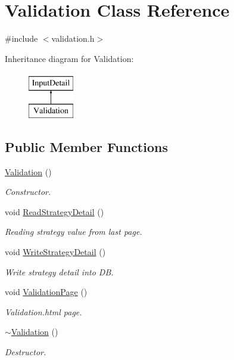 \hypertarget{classValidation}{\section{Validation Class Reference}
\label{classValidation}
}


{\ttfamily \#include $<$validation.\-h$>$}

Inheritance diagram for Validation\-:\begin{figure}[H]
\begin{center}
\leavevmode
\includegraphics[height=2.000000cm]{classValidation}
\end{center}
\end{figure}
\subsection*{Public Member Functions}
\begin{DoxyCompactItemize}
\item 
\hyperlink{classValidation_ada040c6d31004cc277e2b74290eec266}{Validation} ()
\begin{DoxyCompactList}\small\item\em Constructor. \end{DoxyCompactList}\item 
void \hyperlink{classValidation_ae90664b10a86d16af9991247a9875e9a}{Read\-Strategy\-Detail} ()
\begin{DoxyCompactList}\small\item\em Reading strategy value from last page. \end{DoxyCompactList}\item 
void \hyperlink{classValidation_ad4923b9d3fa95a060f922207468ae2f4}{Write\-Strategy\-Detail} ()
\begin{DoxyCompactList}\small\item\em Write strategy detail into D\-B. \end{DoxyCompactList}\item 
void \hyperlink{classValidation_af93988b87e0fd8d086e0c7aed80ba0b7}{Validation\-Page} ()
\begin{DoxyCompactList}\small\item\em Validation.\-html page. \end{DoxyCompactList}\item 
\hyperlink{classValidation_a8f5a5bdb6977eda8313bceabe8db814b}{$\sim$\-Validation} ()
\begin{DoxyCompactList}\small\item\em Destructor. \end{DoxyCompactList}\end{DoxyCompactItemize}
